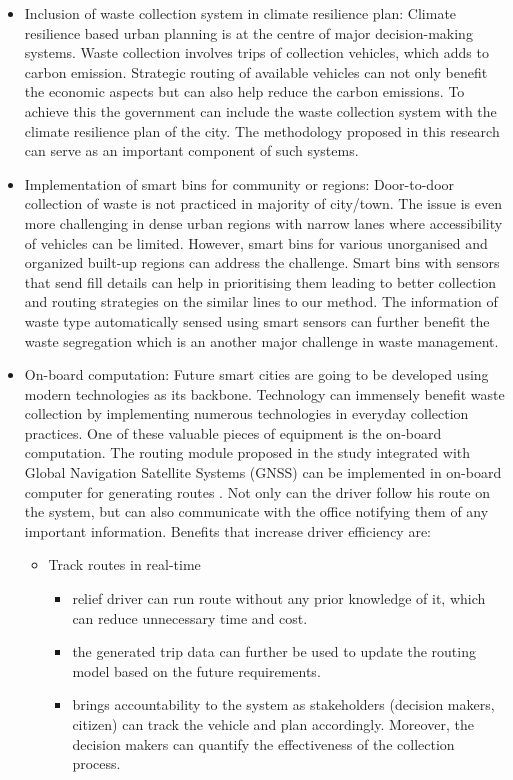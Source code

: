 \documentclass[12pt]{article}
\begin{document}
\begin{itemize}
\item Inclusion of waste collection system in climate resilience plan: Climate resilience based urban planning is at the centre of major decision-making systems. Waste collection involves trips of collection vehicles, which adds to carbon emission. Strategic routing of available vehicles can not only benefit the economic aspects but can also help reduce the carbon emissions. To achieve this the government can include the waste collection system with the climate resilience plan of the city. The methodology proposed in this research can serve as an important component of such systems.
    
\item Implementation of smart bins for community or regions:  Door-to-door collection of waste is not practiced in majority of city/town. The issue is even more challenging in dense urban regions with narrow lanes where accessibility of vehicles can be limited. However, smart bins for various unorganised and organized built-up regions can address the challenge. Smart bins with sensors that send fill details can help in prioritising them leading to better collection and routing strategies on the similar lines to our method. The information of waste type automatically sensed using smart sensors can further benefit the waste segregation which is an another major challenge in waste management.\cite{actionplan}

 \item On-board computation: Future smart cities are going to be developed using modern technologies as its backbone. Technology can immensely benefit waste collection by implementing  numerous technologies in everyday collection practices. One of these valuable pieces of equipment is the on-board computation. The routing module proposed in the study integrated with Global Navigation Satellite Systems (GNSS) can be implemented in on-board computer for generating routes . Not only can the driver follow his route on the system, but can also communicate with the office notifying them of any important information. Benefits that increase driver efficiency are:
 \begin{itemize}
 \item Track routes in real-time
   \begin{itemize}
 \item relief driver can run route without any prior knowledge of it,  which can reduce unnecessary time and cost.\item the generated trip data can further be used to update the routing model based on the future requirements.
   \item brings accountability to the system as stakeholders (decision makers, citizen) can track the vehicle and plan accordingly. Moreover, the decision makers can quantify the effectiveness of the collection process. 
    

\end{itemize}
\end{itemize}
\end{itemize}
\end{document}
